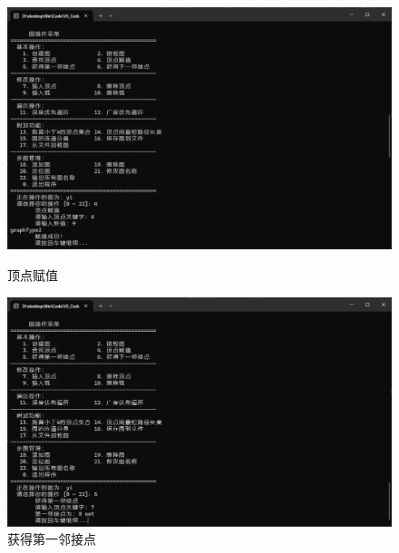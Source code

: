 \documentclass[supercite]{Experimental_Report}
\theoremstyle{definition}
\begin{document}
\begin{figure}[htb]
	\begin{center}
		\includegraphics[scale=0.30]{images/2-4.jpg}
		\caption{顶点赋值}
		\label{fig2-4}
	\end{center}


	\begin{center}
		\includegraphics[scale=0.30]{images/2-5.jpg}
		\caption{获得第一邻接点}
		\label{fig2-5}
	\end{center}
\end{figure}
\end{document}
